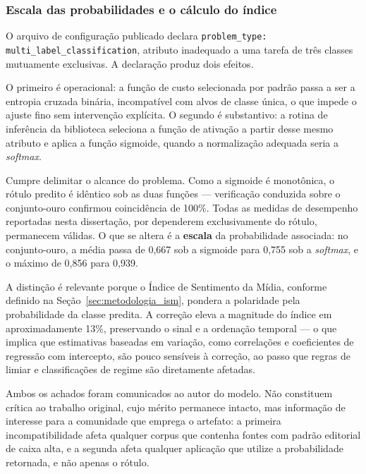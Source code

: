 \subsubsection{Escala das probabilidades e o cálculo do índice}

O arquivo de configuração publicado declara \texttt{problem\_type: multi\_label\_classification},
atributo inadequado a uma tarefa de três classes mutuamente exclusivas. A declaração produz dois
efeitos.

O primeiro é operacional: a função de custo selecionada por padrão passa a ser a entropia cruzada
binária, incompatível com alvos de classe única, o que impede o ajuste fino sem intervenção
explícita. O segundo é substantivo: a rotina de inferência da biblioteca seleciona a função de
ativação a partir desse mesmo atributo e aplica a função sigmoide, quando a normalização adequada
seria a \textit{softmax}.

Cumpre delimitar o alcance do problema. Como a sigmoide é monotônica, o rótulo predito é idêntico
sob as duas funções --- verificação conduzida sobre o conjunto-ouro confirmou coincidência de
100\%. Todas as medidas de desempenho reportadas nesta dissertação, por dependerem exclusivamente
do rótulo, permanecem válidas. O que se altera é a \textbf{escala} da probabilidade associada: no
conjunto-ouro, a média passa de 0,667 sob a sigmoide para 0,755 sob a \textit{softmax}, e o máximo
de 0,856 para 0,939.

A distinção é relevante porque o Índice de Sentimento da Mídia, conforme definido na
Seção~\ref{sec:metodologia_ism}, pondera a polaridade pela probabilidade da classe predita. A
correção eleva a magnitude do índice em aproximadamente 13\%, preservando o sinal e a ordenação
temporal --- o que implica que estimativas baseadas em variação, como correlações e coeficientes de
regressão com intercepto, são pouco sensíveis à correção, ao passo que regras de limiar e
classificações de regime são diretamente afetadas.

Ambos os achados foram comunicados ao autor do modelo. Não constituem crítica ao trabalho original,
cujo mérito permanece intacto, mas informação de interesse para a comunidade que emprega o
artefato: a primeira incompatibilidade afeta qualquer corpus que contenha fontes com padrão
editorial de caixa alta, e a segunda afeta qualquer aplicação que utilize a probabilidade
retornada, e não apenas o rótulo.
